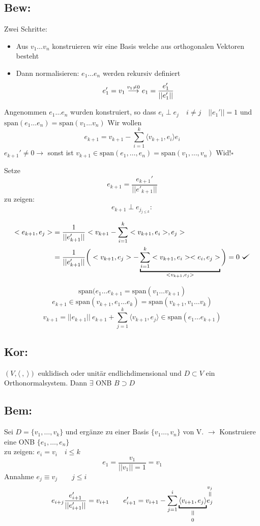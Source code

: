 \documentclass[titlepage,12pt,a4paper,ngerman]{report}
\newenvironment{bew}{\subsection{Bew:}}{\hfill$\square$}
\def\checkmark{\tikz\fill[scale=0.4](0,.35) -- (.25,0) -- (1,.7) -- (.25,.15) -- cycle;}
\newcommand{\Bew}[1]{\begin{bew}#1\end{bew}}
\newcommand{\verteq}{\rotatebox{90}{$\,=$}}
\newcommand{\equalto}[2]{\underset{\scriptstyle\overset{\mkern4mu\verteq}{#2}}{#1}}
\newcommand{\equaltoup}[2]{\overset{\scriptstyle\underset{\mkern4mu\verteq}{#2}}{#1}}
\newcommand{\tx}[1]{\textrm{#1}}
\newcommand{\spa}{\tx{span}}
\newcommand{\summ}[2]{\sum_{#1}^{#2}}
\begin{document}
\Bew{Zwei Schritte: \begin{itemize}
		\item Aus $v_1 \dots v_n$ konstruieren wir eine Basis welche aus orthogonalen Vektoren besteht
		\item Dann normalisieren: $e_1 \dots e_n$ werden rekursiv definiert
		$$e_1' = v_1 \buildrel{v_1 \neq 0}\over{\longrightarrow} e_1 = \frac{e_1'}{||e_1'||}$$
	\end{itemize}
	Angenommen $e_1 \dots e_n$ wurden konstruiert, so dass $e_i \perp e_j \quad i \neq j \quad ||e_1'|| = 1$ und $\spa (e_1 \dots e_n) = \spa (v_1 \dots v_n)$ Wir wollen
	$$e_{k+1} = v_{k +1} - \summ{i=1}{k} \langle v_{k+1}, e_i \rangle e_i$$
	$e_{k+1}' \neq 0 \rightarrow$ sonst ist $v_{k+1} \in \spa (e_1, \dots, e_n) = \spa (v_1, \dots, v_n)$ Wid!}

Setze 
$$ e_{k+1} = \frac{e_{k+1}'}{||e'_{k+1}||}$$
zu zeigen:
$$e_{k+1} \perp e_{j_{j \le k}} :$$

\begin{align*}
< e_{k+1},e_j> &= \frac{1}{||e'_{k+1}||} < v_{k+1} - \sum_{i=1}^{k}< v_{k+1} , e_i > ,e_j>\\
&=\frac{1}{||e'_{k+1}||} \bigg( <v_{k+1},e_j> - \underbracket{\sum_{i=1}^{k} <v_{k+1},e_i> < e_i,e_j>  }_{<v_{k+1},e_j>} \bigg) = 0 \ \checkmark
\end{align*}

$$\spa (e_1 \dots e_{k + 1} = \spa (v_1 \dots v_{k + 1})$$
$$e_{k + 1} \in \spa ( v_{k + 1}, e_1 \dots e_k) = \spa(v_{k+1},v_1 \dots v_k)$$
$$v_{k+1} = ||e_{k+1}||\ e_{k+1}+\summ{j=1}{k} \langle v_{k+1}, e_j \rangle \in \spa (e_1 \dots e_{k+1})$$

\subsection{Kor:}
$ (V,\langle \ ,\ \rangle) $ euklidisch oder unitär endlichdimensional und $ D \subset V $ ein Orthonormalsystem. Dann $ \exists $ ONB $ B \supset D $ 
\subsection{Bem:}
Sei $ D = \{v_1,\dots,v_k \} $ und ergänze zu einer Basis $ \{v_1 \dots,v_n \} $ von V. $ \rightarrow $ Konstruiere eine ONB $ \{e_1,\dots,e_n\} $\\
zu zeigen: $ e_i = v_i \quad i \le k $\\
$$ e_1 = \frac{v_1}{||v_1|| =1} = v_1 $$
Annahme $ e_j \equiv v_j \qquad j \le i $\\
$$ e_{i+j} \frac{e'_{i+1}}{||e'_{i+1}||} = v_{i+1} \qquad e'_{i+1} = v _{i+1} - \sum_{j=1}^{i} \equalto{\underbracket{\langle v_{i+1},e_j \rangle }}{0} \equaltoup{e_j}{v_j}$$ 
\end{document}

